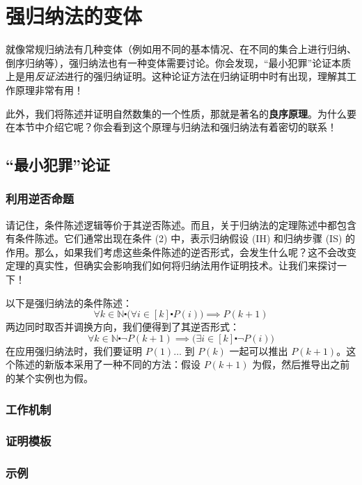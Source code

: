 \section{强归纳法的变体}

就像常规归纳法有几种变体（例如用不同的基本情况、在不同的集合上进行归纳、倒序归纳等），强归纳法也有一种变体需要讨论。你会发现，``最小犯罪''论证本质上是用\emph{反证法}进行的强归纳证明。这种论证方法在归纳证明中时有出现，理解其工作原理非常有用！

此外，我们将陈述并证明自然数集的一个性质，那就是著名的\textbf{良序原理}。为什么要在本节中介绍它呢？你会看到这个原理与归纳法和强归纳法有着密切的联系！

\subsection{``最小犯罪''论证}

\subsubsection*{利用逆否命题}

请记住，条件陈述逻辑等价于其逆否陈述。而且，关于归纳法的定理陈述中都包含有条件陈述。它们通常出现在条件 (2) 中，表示归纳假设 (IH) 和归纳步骤 (IS) 的作用。那么，如果我们考虑这些条件陈述的逆否形式，会发生什么呢？这不会改变定理的真实性，但确实会影响我们如何将归纳法用作证明技术。让我们来探讨一下！

以下是强归纳法的条件陈述：
\[\forall k \in \mathbb{N} \centerdot \big(\forall i \in [k] \centerdot P(i)\big) \implies P(k+1)\]
两边同时取否并调换方向，我们便得到了其逆否形式：
\[\forall k \in \mathbb{N} \centerdot \neg P(k+1) \implies \big(\exists i \in [k] \centerdot \neg P(i)\big)\]
在应用强归纳法时，我们要证明 $P(1) \dots$ 到 $P(k)$ 一起可以推出 $P(k+1)$。这个陈述的新版本采用了一种不同的方法：假设 $P(k+1)$ 为假，然后推导出之前的某个实例也为假。

\subsubsection*{工作机制}

\subsubsection*{证明模板}

\subsubsection*{示例}

